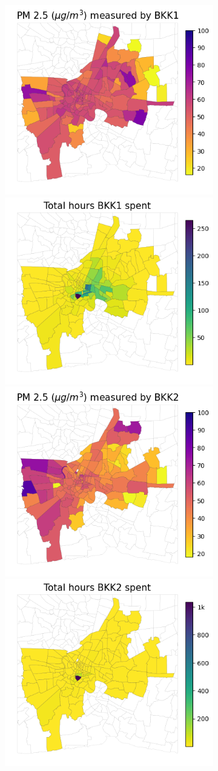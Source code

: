 \begin{figure}
    \centering
    \begin{subfigure}[t]{0.49\textwidth}
        \centering
        \includegraphics[width=.49\linewidth]{figures/map/BKK1_PM25.png}%
        \includegraphics[width=.49\linewidth]{figures/map/BKK1_time.png}
        \includegraphics[width=.49\linewidth]{figures/map/BKK2_PM25.png}%
        \includegraphics[width=.49\linewidth]{figures/map/BKK2_time.png}

\end{subfigure}
\end{figure}
